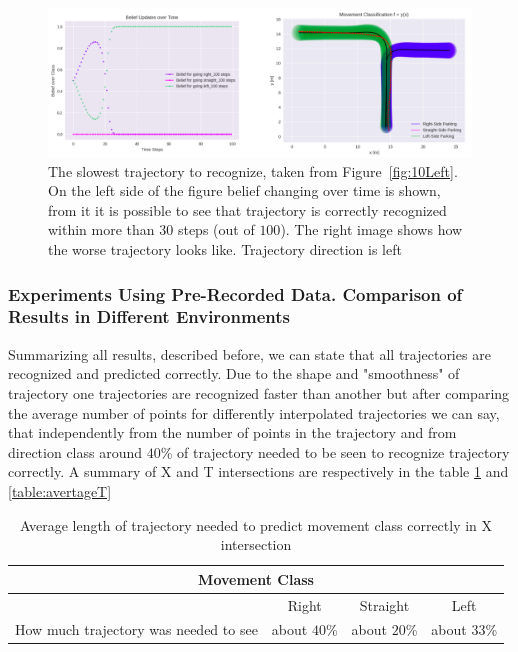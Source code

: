 \begin{figure}[H]
	\centering  	
	\includegraphics[width=13cm]{img/badleftT.png}
	\caption{The slowest trajectory to recognize, taken from Figure~\ref{fig:10Left}. On the left side of the figure belief changing over time is shown, from it it is possible to see that trajectory is correctly recognized within more than $30$ steps (out of $100$). The right image shows how the worse trajectory looks like. Trajectory direction is left}
	\label{fig:LeftBadT}    
\end{figure}

\subsubsection{Experiments Using Pre-Recorded Data. Comparison of Results in Different Environments}

Summarizing all results, described before, we can state that all trajectories are recognized and predicted correctly. Due to the shape and "smoothness" of trajectory one trajectories are recognized faster than another but after comparing the average number of points for differently interpolated trajectories we can say, that independently from the number of points in the trajectory and from direction class around $40$\% of trajectory needed to be seen to recognize trajectory correctly. A summary of X and T intersections are respectively in the table \ref{table:averageX} and \ref{table:avertageT}

\begin{table}[h!]
	\centering
	\begin{tabular}{ |c|c|c|c|}
		\hline
		\multicolumn{4}{|c|}{Movement Class} \\
		\hline
		& Right & Straight & Left \\
		\hline
		How much trajectory was needed to see & about $40$\% & about $20$\% & about $33$\% \\
		\hline
	\end{tabular}
	\caption{Average length of trajectory needed to predict movement class correctly in X intersection}
	\label{table:averageX}
\end{table}

